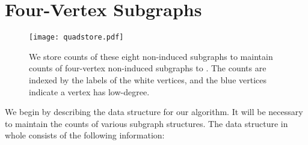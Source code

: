 \documentclass[11pt]{article}
\begin{document}
\section{Four-Vertex Subgraphs}

\begin{figure}[!b]
\vspace{-20pt}
\begin{center}
\texttt{[image: quadstore.pdf]}
\end{center}
\vspace{-24pt}
\caption{We store counts of these eight non-induced subgraphs to maintain counts of
four-vertex non-induced subgraphs  to . The counts are indexed by the
labels of the white vertices, and the blue vertices indicate a vertex 
has low-degree.}
\label{fig-quadstore}
\end{figure}

We begin by describing the data structure for our algorithm.  It will be necessary to maintain the counts of various subgraph structures.  The data structure in whole consists of the following information:
\end{document}
